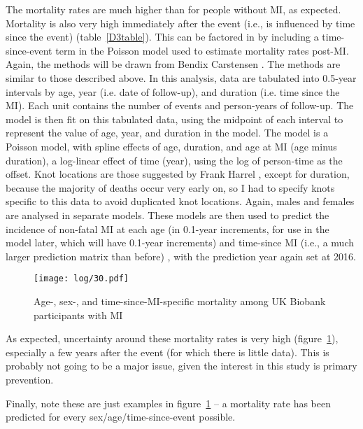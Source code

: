 \documentclass[11pt]{article}
\begin{document}
The mortality rates are much higher than for people without MI, as expected.
Mortality is also very high immediately after the event (i.e., is influenced by
time since the event) (table~\ref{D3table}). This can be factored in by including a time-since-event term in the Poisson model
used to estimate mortality rates post-MI. 
Again, the methods will be drawn from Bendix Carstensen \cite{CarstensenBMJO2020}. The methods are similar 
to those described above. In this analysis, data are tabulated into 0.5-year intervals by age, year (i.e. date of follow-up),
and duration (i.e. time since the MI). Each unit contains the number of events and person-years of follow-up. 
The model is then fit on this tabulated data, using the midpoint of each interval to represent the value of age, year, and duration
in the model. The model is a Poisson model, with spline effects of age, duration, and age at MI (age minus duration), a log-linear effect
of time (year), using the log of person-time as the offset. 
Knot locations are those suggested by Frank Harrel \cite{Harrell2001Springer}, except for duration, because
the majority of deaths occur very early on, so I had to specify knots specific to this data to avoid duplicated knot locations.
Again, males and females are analysed in separate models. 
These models are then used to predict the incidence of non-fatal MI at each age (in 0.1-year increments,
for use in the model later, which will have 0.1-year increments) and time-since MI (i.e., a much larger prediction matrix than before)
, with the prediction year again set at 2016. 

\color{Blue4}
\begin{stlog}\end{stlog}
\begin{figure}
    \centering
    \texttt{[image: log/30.pdf]}
    \caption{Age-, sex-, and time-since-MI-specific mortality among UK Biobank participants with MI}
    \label{PMImort}
\end{figure}
\begin{stlog}\end{stlog}
\color{black}

As expected, uncertainty around these mortality rates is very high (figure~\ref{PMImort}), 
especially a few years after the event (for which there is little data).
This is probably not going to be a major issue, given the interest in this study is primary prevention. 

Finally, note these are just examples in figure~\ref{PMImort} --
a mortality rate has been predicted for every sex/age/time-since-event possible. 
\end{document}
